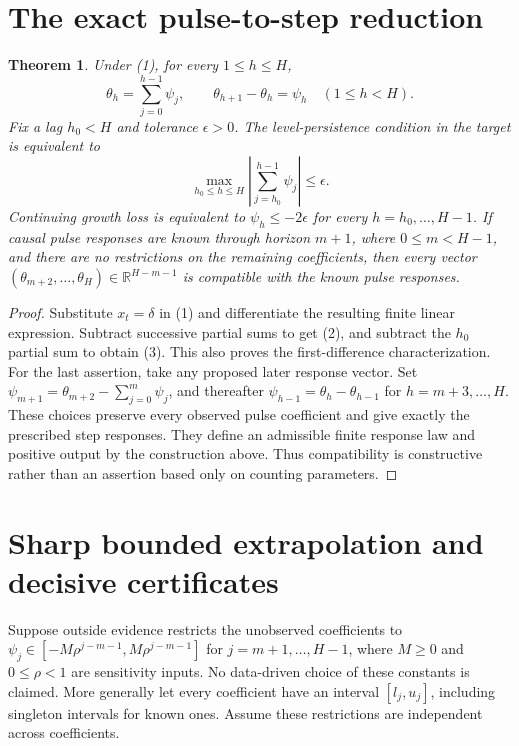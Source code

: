 \documentclass[11pt]{article}
\newtheorem{theorem}{Theorem}
\newcommand{\R}{\mathbb R}
\begin{document}
\section{The exact pulse-to-step reduction}
\begin{theorem}\label{step}
Under (1), for every $1\leq h\leq H$,
\[
 \theta_h=\sum_{j=0}^{h-1}\psi_j,\qquad
 \theta_{h+1}-\theta_h=\psi_h\quad(1\leq h<H).                 \tag{2}
\]
Fix a lag $h_0<H$ and tolerance $\epsilon>0$. The level-persistence
condition in the target is equivalent to
\[
 \max_{h_0\leq h\leq H}
       \left|\sum_{j=h_0}^{h-1}\psi_j\right|\leq\epsilon.       \tag{3}
\]
Continuing growth loss is equivalent to
$\psi_h\leq-2\epsilon$ for every $h=h_0,\ldots,H-1$.
If causal pulse responses are known through horizon $m+1$, where
$0\leq m<H-1$, and there are no restrictions on the remaining coefficients,
then every vector $(\theta_{m+2},\ldots,\theta_H)\in\R^{H-m-1}$
is compatible with the known pulse responses.
\end{theorem}
\begin{proof}
Substitute $x_t=\delta$ in (1) and differentiate the resulting finite
linear expression. Subtract successive partial sums to get (2), and
subtract the $h_0$ partial sum to obtain (3). This also proves the
first-difference characterization. For the last assertion, take any
proposed later response vector. Set
$\psi_{m+1}=\theta_{m+2}-\sum_{j=0}^{m}\psi_j$, and thereafter
$\psi_{h-1}=\theta_h-\theta_{h-1}$ for $h=m+3,\ldots,H$.
These choices preserve every observed pulse coefficient and give exactly
the prescribed step responses. They define an admissible finite response
law and positive output by the construction above. Thus compatibility is
constructive rather than an assertion based only on counting parameters.
\end{proof}

\section{Sharp bounded extrapolation and decisive certificates}
Suppose outside evidence restricts the unobserved coefficients to
$\psi_j\in[-M\rho^{j-m-1},M\rho^{j-m-1}]$ for $j=m+1,\ldots,H-1$,
where $M\geq0$ and $0\leq\rho<1$ are sensitivity inputs. No data-driven
choice of these constants is claimed. More generally let every coefficient
have an interval $[l_j,u_j]$, including singleton intervals for known ones.
Assume these restrictions are independent across coefficients.
\end{document}
